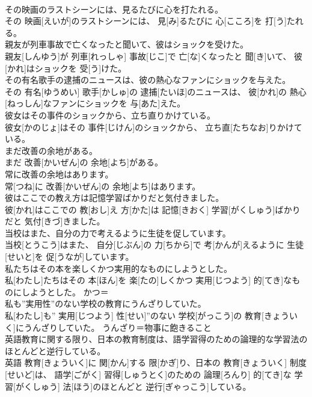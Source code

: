 \documentclass[8pt]{extreport}
\begin{document}
\begin{CJK}{UTF8}{min}
\\	その映画のラストシーンには、見るたびに心を打たれる。	
\\	その 映画[えいが]のラストシーンには、 見[み]るたびに 心[こころ]を 打[う]たれる。	
\\	親友が列車事故で亡くなったと聞いて、彼はショックを受けた。	
\\	親友[しんゆう]が 列車[れっしゃ] 事故[じこ]で 亡[な]くなったと 聞[き]いて、 彼[かれ]はショックを 受[う]けた。	
\\	その有名歌手の逮捕のニュースは、彼の熱心なファンにショックを与えた。	
\\	その 有名[ゆうめい] 歌手[かしゅ]の 逮捕[たいほ]のニュースは、 彼[かれ]の 熱心[ねっしん]なファンにショックを 与[あた]えた。	
\\	彼女はその事件のショックから、立ち直りかけている。	
\\	彼女[かのじょ]はその 事件[じけん]のショックから、 立ち直[たちなお]りかけている。	
\\	まだ改善の余地がある。	
\\	まだ 改善[かいぜん]の 余地[よち]がある。	
\\	常に改善の余地はあります。	
\\	常[つね]に 改善[かいぜん]の 余地[よち]はあります。	
\\	彼はここでの教え方は記憶学習ばかりだと気付きました。	
\\	彼[かれ]はここでの 教[おし]え 方[かた]は 記憶[きおく] 学習[がくしゅう]ばかりだと 気付[きづ]きました。	
\\	当校はまた、自分の力で考えるように生徒を促しています。	
\\	当校[とうこう]はまた、 自分[じぶん]の 力[ちから]で 考[かんが]えるように 生徒[せいと]を 促[うなが]しています。	
\\	私たちはその本を楽しくかつ実用的なものにしようとした。	
\\	私[わたし]たちはその 本[ほん]を 楽[たの]しくかつ 実用[じつよう] 的[てき]なものにしようとした。	かつ＝ 
\\	私も”実用性”のない学校の教育にうんざりしていた。	
\\	私[わたし]も” 実用[じつよう] 性[せい]”のない 学校[がっこう]の 教育[きょういく]にうんざりしていた。	うんざり＝物事に飽きること
\\	英語教育に関する限り、日本の教育制度は、語学習得のための論理的な学習法のほとんどと逆行している。	
\\	英語 教育[きょういく]に 関[かん]する 限[かぎ]り、日本の 教育[きょういく] 制度[せいど]は、 語学[ごがく] 習得[しゅうとく]のための 論理[ろんり] 的[てき]な 学習[がくしゅう] 法[ほう]のほとんどと 逆行[ぎゃっこう]している。	

\end{CJK}
\end{document}
